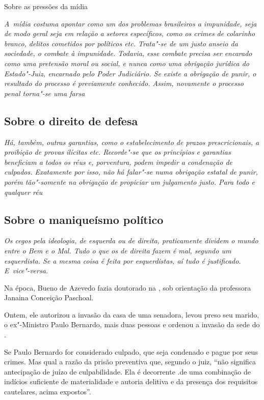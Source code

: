 Sobre as pressões da mídia

\emph{A~mídia costuma apontar como um dos problemas brasileiros a
impunidade, seja de modo geral seja em relação a setores específicos,
como os crimes de colarinho branco, delitos cometidos por políticos etc.
Trata"-se de um justo anseio da sociedade, o combate à impunidade.
Todavia, esse combate precisa ser encarado como uma pretensão moral ou
social, e nunca como uma obrigação jurídica do Estado"-Juiz, encarnado
pelo Poder Judiciário. Se existe a obrigação de punir, o resultado do
processo é previamente conhecido. Assim, novamente o processo penal
torna"-se uma farsa}

\subsection{Sobre o direito de defesa}

\emph{Há, também, outras garantias, como o estabelecimento de prazos
prescricionais, a proibição de provas ilícitas etc. Recorde"-se que os
princípios e garantias beneficiam a todos os réus e, porventura, podem
impedir a condenação de culpados. Exatamente por isso, não há falar"-se
numa obrigação estatal de punir, porém tão"-somente na obrigação de
propiciar um julgamento justo. Para todo e qualquer réu}

\subsection{Sobre o maniqueísmo político}

\emph{Os cegos pela ideologia, de esquerda ou de direita, praticamente
dividem o mundo entre o Bem e o Mal. Tudo o que os de direita fazem é
mal, segundo um esquerdista. Se a mesma coisa é feita por esquerdistas,
aí tudo é justificado. E~vice"-versa.}

Na época, Bueno de Azevedo fazia doutorado na , sob orientação da
professora Janaina Conceição Paschoal.

Ontem, ele autorizou a invasão da casa de uma senadora, levou preso seu
marido, o ex"-Ministro Paulo Bernardo, mais duas pessoas e ordenou a
invasão da sede do .

Se Paulo Bernardo for considerado culpado, que seja condenado e pague
por seus crimes. Mas qual a razão da prisão preventiva que, segundo o
juiz, ``não significa antecipação de juízo de culpabilidade. Ela é
decorrente .de uma combinação de indícios suficiente de materialidade e
autoria delitiva e da presença dos requisitos cautelares, acima
expostos''.

